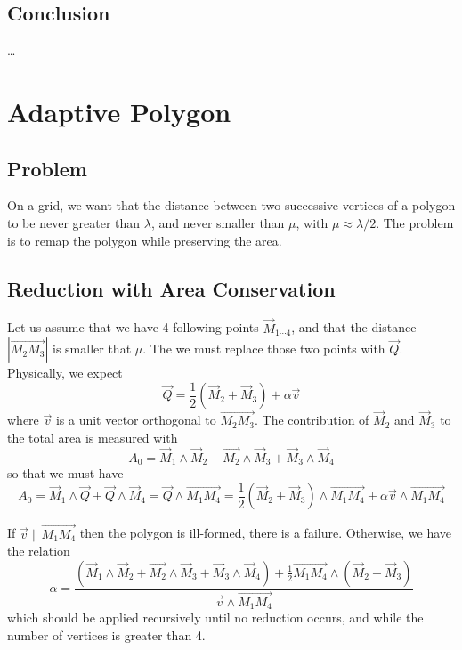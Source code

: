 \documentclass[aps]{revtex4}
\newcommand{\myvec}[1]{\overrightarrow{#1}}
\begin{document}
\subsection{Conclusion}
…

\section{Adaptive Polygon}

\subsection{Problem}
On a grid, we want that the distance between two successive vertices of a polygon to be
never greater than $\lambda$, and never smaller than $\mu$, with $\mu\approx\lambda/2$.
The problem is to remap the polygon while preserving the area.

\subsection{Reduction with Area Conservation}

Let us assume that we have 4 following points $\vec{M}_{1\cdots4}$, and that the distance $|\myvec{M_2M_3}|$ is smaller that $\mu$.
The we must replace those two points with  $\vec{Q}$.
Physically, we expect 
$$
	\vec{Q} = \dfrac{1}{2}\left(\vec{M}_2+\vec{M}_3\right) + \alpha \vec{v}
$$
where $\vec{v}$ is a unit vector orthogonal to $\myvec{M_2M_3}$.
The contribution of $\vec{M}_2$ and $\vec{M}_3$ to the total area is measured with
$$
	A_0 = \vec{M}_1\wedge\vec{M}_2 + \vec{M_2}\wedge\vec{M}_3 + \vec{M}_3\wedge\vec{M}_4
$$
so that we must have
$$
	A_0 = \vec{M}_1\wedge\vec{Q} + \vec{Q}\wedge\vec{M}_4 = \vec{Q}\wedge \myvec{M_1M_4} = \dfrac{1}{2}\left(\vec{M}_2+\vec{M}_3\right)\wedge \myvec{M_1M_4} 
	+ \alpha \vec{v} \wedge \myvec{M_1M_4}
$$

If $\vec{v}\parallel\myvec{M_1M_4}$ then the polygon is ill-formed, there is a failure.
Otherwise, we have the relation
$$
	\alpha = \dfrac{\left(\vec{M}_1\wedge\vec{M}_2 + \vec{M_2}\wedge\vec{M}_3 + \vec{M}_3\wedge\vec{M}_4\right)
	+\frac{1}{2} \myvec{M_1M_4} \wedge\left(\vec{M}_2+\vec{M}_3\right)
	}{\vec{v} \wedge \myvec{M_1M_4}}
$$
which should be applied recursively until no reduction occurs, and while the number of vertices is greater than 4.
\end{document}
